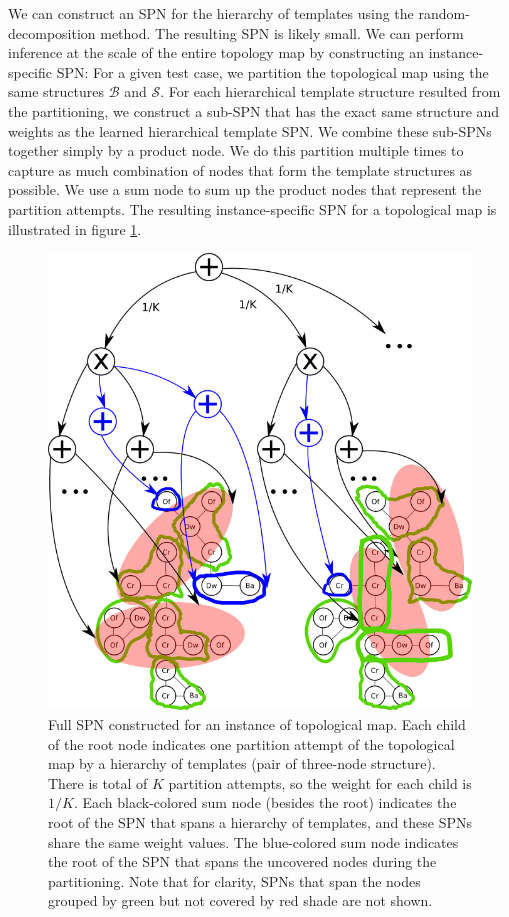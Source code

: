 \documentclass[10pt, titlepage]{article}
\theoremstyle{definition}
\begin{document}
We can construct an SPN for the hierarchy of templates using the random-decomposition method. The resulting SPN is likely small. We can perform inference at the scale of the entire topology map by constructing an instance-specific SPN: For a given test case, we partition the topological map using the same structures $\mathcal{B}$ and $\mathcal{S}$. For each hierarchical template structure resulted from the partitioning, we construct a sub-SPN that has the exact same structure and weights as the learned hierarchical template SPN. We combine these sub-SPNs together simply by a product node.  We do this partition multiple times to capture as much combination of nodes that form the template structures as possible. We use a sum node to sum up the product nodes that represent the partition attempts. The resulting instance-specific SPN for a topological map is illustrated in figure \ref{fig:full_spn_illus}.


\begin{figure}[!htb]
    \centering
    \captionsetup{width=.8\linewidth}
    \includegraphics[scale=0.5]{images/full_spn.png}
    \caption{Full SPN constructed for an instance of topological map. Each child of the root node indicates one partition attempt of the topological map by a hierarchy of templates (pair of three-node structure). There is total of $K$ partition attempts, so the weight for each child is $1/K$. Each black-colored sum node (besides the root) indicates the root of the SPN that spans a hierarchy of templates, and these SPNs share the same weight values. The blue-colored sum node indicates the root of the SPN that spans the uncovered nodes during the partitioning. Note that for clarity, SPNs that span the nodes grouped by green but not covered by red shade are not shown.}
    \label{fig:full_spn_illus}
\end{figure}
\end{document}
